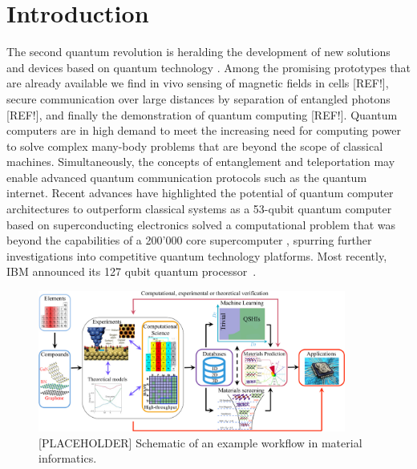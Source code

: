 \documentclass[superscriptaddress,unsortedaddress,
 amsmath,amssymb,
 aps,
]{revtex4-2}
\newcommand{\marianne}[1]{\textcolor{blue}{#1}}
\begin{document}
\section*{Introduction}%
The second quantum revolution is heralding the development of new solutions and devices based on quantum technology \cite{Acin2018}. Among the promising prototypes that are already available we find in vivo sensing of magnetic fields in cells [REF!], secure communication over large distances by separation of entangled photons [REF!], and finally the demonstration of quantum computing [REF!]. 
Quantum computers are in high demand to meet the increasing need for computing power to solve complex many-body problems that are beyond the scope of classical machines.   
Simultaneously, the concepts of entanglement and teleportation may enable advanced quantum communication protocols such as the quantum internet. 
Recent advances have highlighted the potential of quantum computer architectures to outperform classical systems as a 53-qubit quantum computer based on superconducting electronics solved a computational problem that was beyond the capabilities of a 200'000 core supercomputer \cite{Arute_2019}, spurring further investigations into competitive quantum technology platforms. Most recently, IBM announced its 127 qubit quantum processor~\cite{IBM2021}.

\begin{figure}[t]
    \centering
    \includegraphics[width=0.9\textwidth]{figures/ht-workflow.jpg}
    \caption{[PLACEHOLDER] Schematic of an example workflow in material informatics. 
    }
    \label{fig:paradigm}
\end{figure}
\end{document}
